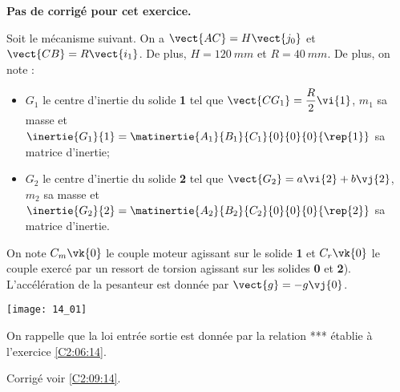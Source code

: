 \normaltrue \difficilefalse \tdifficilefalse
\correctionfalse


\setcounter{numques}{0}
\ifcorrection
\else
\textbf{Pas de corrigé pour cet exercice.}
\fi

\ifprof
\else
Soit le mécanisme suivant. On a $\vect{AC}=H\vect{j_0}$ et $\vect{CB}=R\vect{i_1}$. De plus, 
$H=\SI{120}{mm}$ et $R=\SI{40}{mm}$. De plus, on note :
\begin{itemize}
\item $G_1$ le centre d'inertie du solide \textbf{1} tel que $\vect{CG_1}=\dfrac{R}{2} \vi{1}$, $m_1$ sa masse et $\inertie{G_1}{1}=\matinertie{A_1}{B_1}{C_1}{0}{0}{0}{\rep{1}}$ sa matrice d'inertie;
\item $G_2$ le centre d'inertie du solide \textbf{2} tel que $\vect{G_2}=a \vi{2}+b\vj{2}$, $m_2$ sa masse et $\inertie{G_2}{2}=\matinertie{A_2}{B_2}{C_2}{0}{0}{0}{\rep{2}}$ sa matrice d'inertie.
\end{itemize}
On note $C_m\vk{0}$ le couple moteur agissant sur le solide \textbf{1} et $C_r\vk{0}$ le couple exercé par un ressort de torsion agissant sur les solides \textbf{0} et \textbf{2}). L'accélération de la pesanteur est donnée par $\vect{g}=-g\vj{0}$.

\begin{center}
\texttt{[image: 14\_01]}
\end{center}
\fi

On rappelle que la loi entrée sortie est donnée par la relation *** établie à l'exercice \ref{C2:06:14}.

\ifprof
\else
\fi

\ifprof
\else
\fi

\ifprof
\else
\fi

\ifprof
\else
\fi

\ifprof
\else
\fi

\ifprof
\else
\begin{flushright}
\footnotesize{Corrigé  voir \ref{C2:09:14}.}
\end{flushright}%
\fi